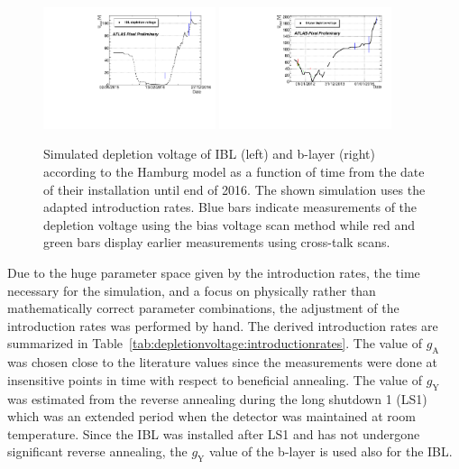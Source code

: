 \begin{figure}[!htpb]
\centering
\includegraphics[width=0.45\textwidth]{IBL_2016_new.pdf}
\includegraphics[width=0.45\textwidth]{BLayer_2016_new.pdf}
\caption{Simulated depletion voltage of IBL (left) and b-layer (right) according to the Hamburg model as a function of time from the date of their installation until end of 2016. The shown simulation uses the adapted introduction rates. Blue bars indicate measurements of the depletion voltage using the bias voltage scan method while red and green bars display earlier measurements using cross-talk scans.}
\label{fig:electricfield:depletionvoltage}
\end{figure}

Due to the huge parameter space given by the introduction rates, the time necessary for the simulation, and a focus on physically rather than mathematically correct parameter combinations, the adjustment of the introduction rates was performed by hand. The derived introduction rates are summarized in Table~\ref{tab:depletionvoltage:introductionrates}.  The value of $g_\text{A}$ was chosen close to the literature values since the measurements were done at insensitive points in time with respect to beneficial annealing. The value of $g_\text{Y}$ was estimated from the reverse annealing during the long shutdown 1 (LS1) which was an extended period when the detector was maintained at room temperature. Since the IBL was installed after LS1 and has not undergone significant reverse annealing, the $g_\text{Y}$ value of the b-layer is used also for the IBL. %

